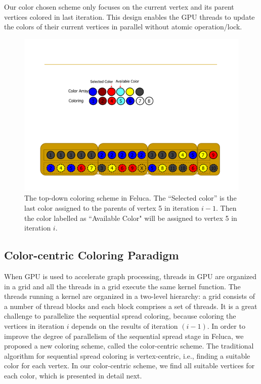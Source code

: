 Our color chosen scheme only focuses on the current vertex and its parent vertices colored in last iteration. This design enables the GPU threads to update the colors of their current vertices in parallel without atomic operation/lock. 

\begin{figure}[h]
	\centering
		\includegraphics[scale=0.4]{figure/colorsec_re.pdf}
	\caption{The top-down coloring scheme in Feluca. The ``Selected color'' is the last color assigned to the parents of vertex 5 in iteration $i-1$. Then the color labelled as ``Available Color" will be assigned to vertex 5 in iteration $i$.}
	\label{fig:colorsec}%
\end{figure}

\subsection{Color-centric Coloring Paradigm}
\label{color-centric}

When GPU is used to accelerate graph processing, threads in GPU are organized in a grid and all the threads in a grid execute the same kernel function. The threads running a kernel are organized in a two-level hierarchy: a grid consists of a number of thread blocks and each block comprises a set of threads. It is a great challenge to parallelize the sequential spread coloring, because coloring the vertices in iteration $i$ depends on the results of iteration $(i-1)$.
In order to improve the degree of parallelism of the sequential spread stage in Feluca, we proposed a new coloring scheme, called the color-centric scheme. 
The traditional algorithm for sequential spread coloring is vertex-centric, i.e., finding a suitable color for each vertex. In our color-centric scheme, we find all suitable vertices for each color, which is presented in detail next. 

